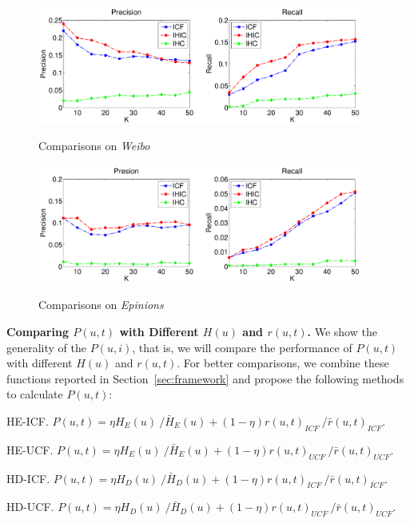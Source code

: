 \documentclass{llncs}
\begin{document}
\begin{figure}[ht]
\begin{minipage}[t]{0.5\linewidth}
  \centering
  \includegraphics[width=0.95\textwidth]{res/isu_a_pr_weibo_comparison.pdf}\\
  \vspace*{-0.4cm}
  \caption{Comparisons on \emph{Weibo}} \label{fig:aprweibocomp}
\end{minipage}%
\begin{minipage}[t]{0.5\linewidth}
  \centering
  \includegraphics[width=0.95\textwidth]{res/isu_a_pr_epinion_comparison.pdf}\\
  \vspace*{-0.4cm}
  \caption{Comparisons on \emph{Epinions}} \label{fig:aprepinioncomp}
\end{minipage}
\end{figure}


\textbf{Comparing $P(u,t)$ with Different $H(u)$ and $r(u,t)$. }
We show the generality of the $P(u,i)$, that is, we will compare the performance of $P(u,t)$ with different $H(u)$ and $r(u,t)$. For better comparisons, we combine these functions reported in Section~\ref{sec:framework} and propose the following methods to calculate $P(u,t)$:
\begin{compactitem}
  \item HE-ICF. $P(u,t) = \eta H_{E}(u)~/\bar{H}_{E}(u) + (1-\eta) r(u,t)_{ICF}~/\bar{r}(u,t)_{ICF}$.
  \item HE-UCF. $P(u,t) = \eta H_{E}(u)~/\bar{H}_{E}(u) + (1-\eta) r(u,t)_{UCF}~/\bar{r}(u,t)_{UCF}$.
  \item HD-ICF. $P(u,t) = \eta H_{D}(u)~/\bar{H}_{D}(u) + (1-\eta) r(u,t)_{ICF}~/\bar{r}(u,t)_{ICF}$.
  \item HD-UCF. $P(u,t) = \eta H_{D}(u)~/\bar{H}_{D}(u) + (1-\eta) r(u,t)_{UCF}~/\bar{r}(u,t)_{UCF}$.
\end{compactitem}
\end{document}
